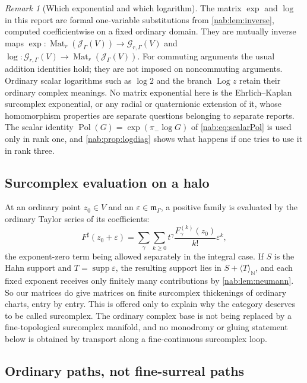 \documentclass[11pt,letterpaper]{article}
\theoremstyle{definition}
\theoremstyle{remark}
\newtheorem{remark}[remark]{Remark}
\newcommand{\N}{\mathbb N}
\newcommand{\JJ}{\mathscr J_\Gamma}
\newcommand{\GG}{\mathscr G_{r,\Gamma}}
\newcommand{\mm}{\mathfrak m_\Gamma}
\newcommand{\Mat}{\operatorname{Mat}}
\newcommand{\supp}{\operatorname{supp}}
\newcommand{\Pol}{\operatorname{Pol}}
\newcommand{\Log}{\operatorname{Log}}
\newcommand{\angles}[1]{\langle #1\rangle_{\N}}
\numberwithin{equation}{section}
\begin{document}
\begin{remark}[Which exponential and which logarithm]
\label{nab:rem:explog}
The matrix $\exp$ and $\log$ in this report are formal one-variable
substitutions from \cref{nab:lem:inverse}, computed coefficientwise on a fixed
ordinary domain. They are mutually inverse maps
$\exp:\Mat_r(\JJ(V))\to\GG(V)$ and
$\log:\GG(V)\to\Mat_r(\JJ(V))$. For commuting arguments the usual
addition identities hold; they are not imposed on noncommuting arguments.
Ordinary scalar logarithms such as $\log 2$ and the branch $\Log z$ retain
their ordinary complex meanings. No matrix exponential here is the
Ehrlich--Kaplan surcomplex exponential, or any radial or quaternionic
extension of it, whose homomorphism properties are separate questions
belonging to separate reports. The scalar identity
$\Pol(G)=\exp(\pi_-\log G)$ of \eqref{nab:eq:scalarPol} is used only in rank
one, and \cref{nab:prop:logdiag} shows what happens if one tries to use it in
rank three.
\end{remark}

\subsection{Surcomplex evaluation on a halo}

At an ordinary point $z_0\in V$ and an $\varepsilon\in\mm$, a positive family
is evaluated by the ordinary Taylor series of its coefficients:
\begin{equation}\label{nab:eq:halo}
 F^\sharp(z_0+\varepsilon)
 =\sum_{\gamma}\sum_{k\geq0}
   t^\gamma\frac{F_\gamma^{(k)}(z_0)}{k!}\varepsilon^k,
\end{equation}
the exponent-zero term being allowed separately in the integral case. If $S$
is the Hahn support and $T=\supp\varepsilon$, the resulting support lies in
$S+\angles T$, and each fixed exponent receives only finitely many
contributions by \cref{nab:lem:neumann}. So our matrices do give matrices on
finite surcomplex thickenings of ordinary charts, entry by entry. This is
offered only to explain why the category deserves to be called surcomplex.
The ordinary complex base is not being replaced by a fine-topological
surcomplex manifold, and no monodromy or gluing statement below is obtained by
transport along a fine-continuous surcomplex loop.

\subsection{Ordinary paths, not fine-surreal paths}
\label{nab:sub:ordinarypaths}
\end{document}
